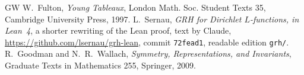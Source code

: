 \documentclass[reqno]{amsart}
\theoremstyle{plain}
\theoremstyle{definition}
\theoremstyle{remark}
\begin{document}
\begin{thebibliography}{GW}
 W.~Fulton, \emph{Young Tableaux}, London Math. Soc. Student Texts 35, Cambridge University Press, 1997.
 L.~Sernau, \emph{GRH for Dirichlet \(L\)-functions, in Lean~4}, a shorter rewriting of the Lean proof, text by Claude, \url{https://github.com/lsernau/grh-lean}, commit \texttt{72fead1}, readable edition \texttt{grh/}.
 R.~Goodman and N.~R.~Wallach, \emph{Symmetry, Representations, and Invariants}, Graduate Texts in Mathematics 255, Springer, 2009.
\end{thebibliography}
\end{document}
